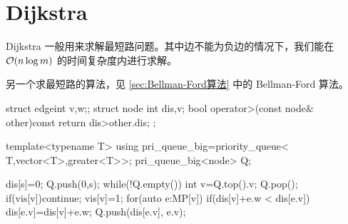 \section{Dijkstra} \label{sec:dijkstra}
Dijkstra 一般用来求解最短路问题。其中边不能为负边的情况下，我们能在 $\mathcal{O}(n
\log m)$ 的时间复杂度内进行求解。

另一个求最短路的算法，见 \ref{sec:Bellman-Ford算法} 中的 Bellman-Ford 算法。

\begin{Cpp}
struct edge{int v,w;};
struct node{
  int dis,v;
  bool operator>(const node& other)const
    {return dis>other.dis;}
};

template<typename T>
using pri_queue_big=priority_queue<
  T,vector<T>,greater<T>>;
pri_queue_big<node> Q;

dis[s]=0;
Q.push({0,s});
while(!Q.empty()){
  int v=Q.top().v; Q.pop();
  if(vis[v])continue;
  vis[v]=1;
  for(auto e:MP[v]){
    if(dis[v]+e.w < dis[e.v]) {
      dis[e.v]=dis[v]+e.w;
      Q.push({dis[e.v], e.v});
    }
  }
}
\end{Cpp}


